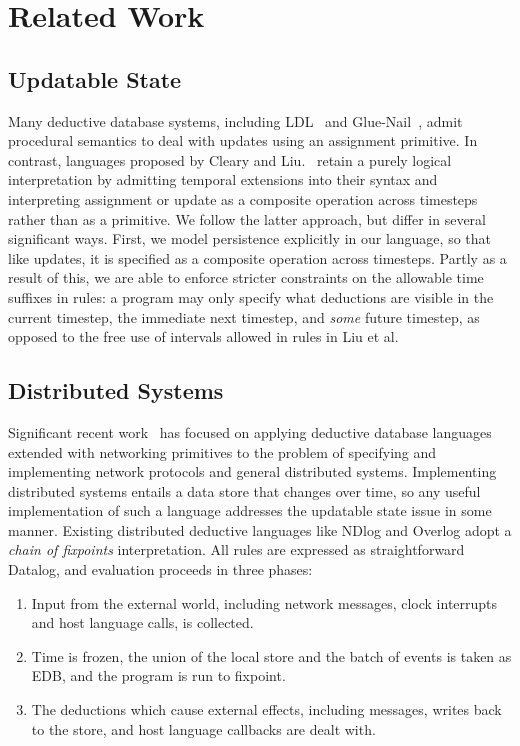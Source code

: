 \section{Related Work}

\subsection{Updatable State}

Many deductive database systems, including LDL~\cite{ldl} and Glue-Nail~\cite{glue-nail}, admit procedural semantics to deal with updates using an
assignment primitive.  In contrast, languages proposed by Cleary and Liu.~\cite{deductiveupdates, starlog, harmful} retain a purely logical 
interpretation by admitting temporal extensions into their syntax and interpreting assignment or update as a composite operation
across timesteps~\cite{deductiveupdates} rather than as a primitive.  We follow the latter approach, but differ in several significant ways.
First, we model persistence explicitly in our language, so that like updates, it is specified as a composite operation across timesteps.
Partly as a result of this, we are able to enforce stricter constraints on the allowable time suffixes in rules: a program may only specify what deductions are visible
in the current timestep, the immediate next timestep, and \emph{some} future timestep, as opposed to the free use of intervals allowed in rules in Liu et al.


\subsection{Distributed Systems}

Significant recent work~\cite{boon, p2, loo-sigmod06, boom-techr} has focused on applying deductive database languages extended with networking 
primitives to the problem of specifying and implementing network protocols and general distributed systems.  Implementing distributed systems entails 
a data store that changes over time, so any useful implementation of such a language addresses the updatable state issue in some manner. 
Existing distributed deductive languages like NDlog and Overlog adopt a \emph{chain of fixpoints} interpretation.  All rules are expressed as 
straightforward Datalog, and evaluation proceeds in three phases:

\begin{enumerate}
\item Input from the external world, including network messages, clock interrupts and host language calls, is collected.
\item Time is frozen, the union of the local store and the batch of events is taken as EDB, and the program is run to fixpoint.
\item The deductions which cause external effects, including messages, writes back to the store, and host language callbacks are dealt with.  
\end{enumerate}

